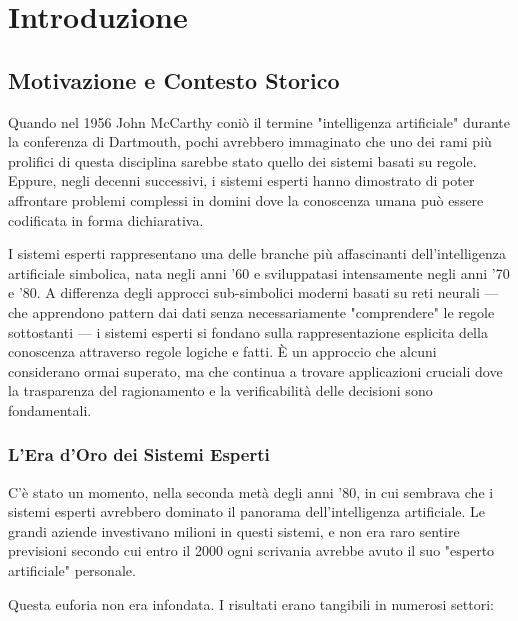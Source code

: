 
\chapter{Introduzione}
\label{cap:introduzione}

\section{Motivazione e Contesto Storico}

Quando nel 1956 John McCarthy coniò il termine "intelligenza artificiale" durante la conferenza di Dartmouth, pochi avrebbero immaginato che uno dei rami più prolifici di questa disciplina sarebbe stato quello dei sistemi basati su regole. Eppure, negli decenni successivi, i sistemi esperti hanno dimostrato di poter affrontare problemi complessi in domini dove la conoscenza umana può essere codificata in forma dichiarativa.

I sistemi esperti rappresentano una delle branche più affascinanti dell'intelligenza artificiale simbolica, nata negli anni '60 e sviluppatasi intensamente negli anni '70 e '80. A differenza degli approcci sub-simbolici moderni basati su reti neurali — che apprendono pattern dai dati senza necessariamente "comprendere" le regole sottostanti — i sistemi esperti si fondano sulla rappresentazione esplicita della conoscenza attraverso regole logiche e fatti. È un approccio che alcuni considerano ormai superato, ma che continua a trovare applicazioni cruciali dove la trasparenza del ragionamento e la verificabilità delle decisioni sono fondamentali.

\subsection{L'Era d'Oro dei Sistemi Esperti}

C'è stato un momento, nella seconda metà degli anni '80, in cui sembrava che i sistemi esperti avrebbero dominato il panorama dell'intelligenza artificiale. Le grandi aziende investivano milioni in questi sistemi, e non era raro sentire previsioni secondo cui entro il 2000 ogni scrivania avrebbe avuto il suo "esperto artificiale" personale.

Questa euforia non era infondata. I risultati erano tangibili in numerosi settori:

